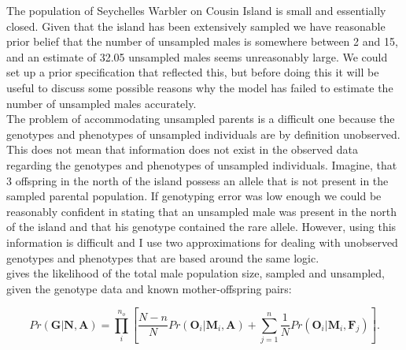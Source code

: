 \documentclass{article}
\begin{document}
The population of Seychelles Warbler on Cousin Island is small and essentially closed. Given that the island has been extensively sampled we have reasonable prior belief that the number of unsampled males is somewhere between 2 and 15, and an estimate of 32.05 unsampled males seems unreasonably large.  We could set up a prior specification that reflected this, but before doing this it will be useful to discuss some possible reasons why the model has failed to estimate the number of unsampled males accurately.\\

The problem of accommodating unsampled parents is a difficult one because the genotypes and phenotypes of unsampled individuals are by definition unobserved. This does not mean that information does not exist in the observed data regarding the genotypes and phenotypes of unsampled individuals.  Imagine, that 3 offspring in the north of the island possess an allele that is not present in the sampled parental population. If genotyping error was low enough we could be reasonably confident in stating that an unsampled male was present in the north of the island and that his genotype contained the rare allele.  However, using this information is difficult and I use two approximations for dealing with unobserved genotypes and phenotypes that are based around the same logic.\\

\citet{Nielsen.2001} gives the likelihood of the total male population size, sampled and unsampled, given the genotype data and known mother-offspring pairs:

\begin{equation} 
Pr(\bm{G}|\bm{N}, \bm{A}) = \prod^{n_{o}}_{i}\left[\frac{N-n}{N}Pr(\bm{O}_{i}|\bm{M}_{i}, \bm{A}) + \sum_{j=1}^{n}\frac{1}{N}Pr(\bm{O}_{i}|\bm{M}_{i}, \bm{F}_{j})\right].
\label{Nielsen-eq}
\end{equation} 
\end{document}
